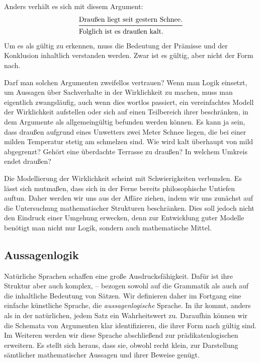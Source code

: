 Anders verhält es sich mit diesem Argument:
\[\begin{array}{@{}l@{}}
\text{Draußen liegt seit gestern Schnee.}\\
\midrule[\inferrulewidth]
\text{Folglich ist es draußen kalt.}
\end{array}\]
Um es als gültig zu erkennen, muss die Bedeutung der Prämisse und der
Konklusion inhaltlich verstanden werden. Zwar ist es gültig,
aber nicht der Form nach.

Darf man solchen Argumenten zweifellos vertrauen? Wenn man Logik
einsetzt, um Aussagen über Sachverhalte in der Wirklichkeit zu machen,
muss man eigentlich zwangsläufig, auch wenn dies wortlos passiert,
ein vereinfachtes Modell der Wirklichkeit aufstellen oder sich auf
einen Teilbereich ihrer beschränken, in dem Argumente als allgemeingültig
befunden werden können. Es kann ja sein, dass draußen aufgrund eines
Unwetters zwei Meter Schnee liegen, die bei einer milden Temperatur
stetig am schmelzen sind. Wie wird kalt überhaupt von mild abgegrenzt?
Gehört eine überdachte Terrasse zu draußen? In welchem Umkreis endet
draußen?

Die Modellierung der Wirklichkeit scheint mit Schwierigkeiten
verbunden. Es lässt sich mutmaßen, dass sich in der Ferne bereits
philosophische Untiefen auftun. Daher werden wir uns aus der Affäre
ziehen, indem wir uns zunächst auf die Untersuchung mathematischer
Strukturen beschränken. Dies soll jedoch nicht den Eindruck einer
Umgehung erwecken, denn zur Entwicklung guter Modelle benötigt man nicht
nur Logik, sondern auch mathematische Mittel.

\subsection{Aussagenlogik}

Natürliche Sprachen schaffen eine große Ausdrucksfähigkeit. Dafür ist
ihre Struktur aber auch komplex, -- bezogen sowohl auf die Grammatik als
auch auf die inhaltliche Bedeutung von Sätzen.  Wir definieren daher
im Fortgang eine einfache künstliche Sprache, die \emph{aussagenlogische}
Sprache. In ihr kommt, anders als in der natürlichen, jedem Satz ein
Wahrheitswert zu. Daraufhin können wir die Schemata von Argumenten klar
identifizieren, die ihrer Form nach gültig sind. Im Weiteren werden
wir diese Sprache abschließend zur prädikatenlogischen erweitern. Es stellt
sich heraus, dass sie, obwohl recht klein, zur Darstellung sämtlicher
mathematischer Aussagen und ihrer Beweise genügt.

